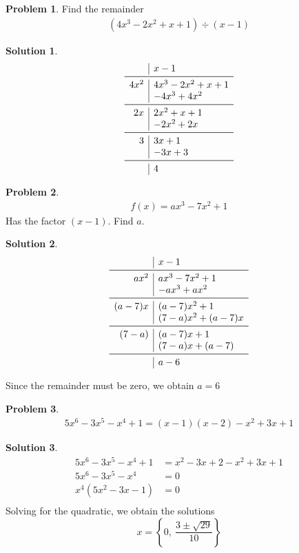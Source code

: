 \documentclass[a4paper]{article}
\theoremstyle{definition}
\newtheorem{problem}{Problem}[section]
\newtheorem*{solution}{Solution}
\begin{document}
\begin{problem}
Find the remainder
\begin{align*}
(4x^3 -2x^2 +x +1) \div  (x-1)
\end{align*}
\end{problem}

\begin{solution}
\[
\begin{array}{r|l}
& x-1 \\
\midrule
4x^2  & 4x^3 -2x^2 +x +1 \\
& -4x^3 + 4x^2 \\
\midrule
2x & 2x^2 +x +1 \\
& -2x^2 + 2x \\
\midrule
3 & 3x+1 \\
& -3x + 3 \\
\midrule
&4
\end{array}
\]
\end{solution}


\begin{problem}
\begin{align*}
f(x) = ax^3 -7x^2 +1
\end{align*}
Has the factor \((x-1)\). Find \(a\).
\end{problem}

\begin{solution}
\[
\begin{array}{r|l}
& x-1 \\
\midrule
ax^2 & ax^3 - 7x^2 +1 \\
& -ax^3 + ax^2 \\
\midrule
(a-7)x & (a-7)x^2 +1 \\
& (7-a)x^2 + (a-7)x \\
\midrule
(7-a) & (a-7)x +1 \\
& (7-a)x + (a-7) \\
\midrule
& a -6
\end{array}
\]

Since the remainder must be zero, we obtain \(a=6\)
\end{solution}

\begin{problem}
\begin{align*}
5x^6 -3x^5 -x^4 +1  = (x-1)(x-2) - x^2 +3x +1 
\end{align*}
\end{problem}

\begin{solution}
\begin{align*}
5x^6 -3x^5 -x^4 + 1 &= x^2 -3x +2 -x^2 +3x +1 \\
5x^6 -3x^5 -x^4 &= 0 \\
x^4(5x^2 -3x -1) &= 0 \\
\end{align*}
Solving for the quadratic, we obtain the solutions 
\[
x= \left\{0,\ \frac{3 \pm \sqrt{29}}{10} \right\}
\]
\end{solution}
\end{document}
